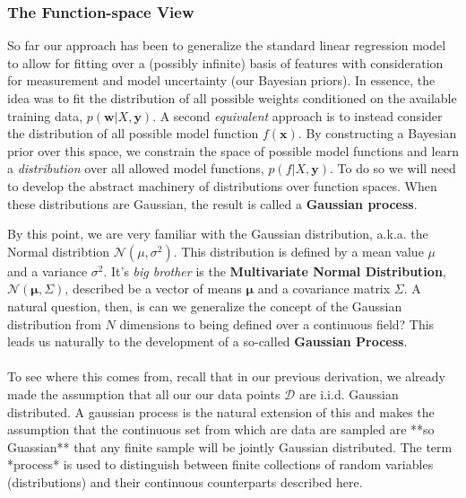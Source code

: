 \subsubsection{The Function-space View}

So far our approach has been to generalize the standard linear regression model to allow for fitting over a (possibly infinite) basis of features with consideration for measurement and model uncertainty (our Bayesian priors). In essence, the idea was to fit the distribution of all possible weights conditioned on the available training data, $p(\mathbf{w} \vert X, \mathbf{y})$. A second \textit{equivalent} approach is to instead consider the distribution of all possible model function $f(\mathbf{x})$. By constructing a Bayesian prior over this space, we constrain the space of possible model functions and learn a \textit{distribution} over all allowed model functions, $p(f \vert X, \mathbf{y})$. To do so we will need to develop the abstract machinery of distributions over function spaces. When these distributions are Gaussian, the result is called a \textbf{Gaussian process}.

By this point, we are very familiar with the Gaussian distribution, a.k.a. the Normal distribtion $\mathcal{N}(\mu, \sigma^2)$. This distribution is defined by a mean value $\mu$ and a variance $\sigma^2$. It's \textit{big brother} is the \textbf{Multivariate Normal Distribution}, $\mathcal{N}(\mathbf{\mu}, \Sigma)$, described be a vector of means $\mathbf{\mu}$ and a covariance matrix $\Sigma$. A natural question, then, is can we generalize the concept of the Gaussian distribution from $N$ dimensions to being defined over a continuous field? This leads us naturally to the development of a so-called \textbf{Gaussian Process}.\\

\\


To see where this comes from, recall that in our previous derivation, we already made the assumption that all our our data points $\mathcal{D}$ are i.i.d. Gaussian distributed. A gaussian process is the natural extension of this and makes the assumption that the continuous set from which are data are sampled are **so Guassian** that any finite sample will be jointly Gaussian distributed. The term *process* is used to distinguish between finite collections of random variables (distributions) and their continuous counterparts described here.


